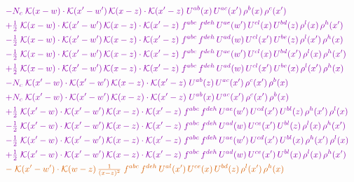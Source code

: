 \documentclass[10pt]{article}
\numberwithin{equation}{section}
\begin{document}
\begin{align}
&\quad{\color{CC}-N_c\;\mathcal{K}(x-w)\cdot\mathcal{K}(x'-w')\,\mathcal{K}(x-z)\cdot\mathcal{K}(x'-z)\;U^{ab}(x)\,U^{ac}(x')\,\rho^{b}(x)\,\rho^{c}(x')}\notag\\
&\quad{\color{CC}+\tfrac{1}{2}\;\mathcal{K}(x-w)\cdot\mathcal{K}(x'-w')\,\mathcal{K}(x-z)\cdot\mathcal{K}(x'-z)\;f^{abc}\,f^{deh}\,U^{ae}(w')\,U^{cl}(x)\,U^{bd}(z)\,\rho^{l}(x)\,\rho^{h}(x')}\notag\\
&\quad{\color{CC}-\tfrac{1}{2}\;\mathcal{K}(x-w)\cdot\mathcal{K}(x'-w')\,\mathcal{K}(x-z)\cdot\mathcal{K}(x'-z)\;f^{abc}\,f^{deh}\,U^{ad}(w)\,U^{cl}(x')\,U^{be}(z)\,\rho^{l}(x')\,\rho^{h}(x)}\notag\\
&\quad{\color{CC}-\tfrac{1}{2}\;\mathcal{K}(x-w)\cdot\mathcal{K}(x'-w')\,\mathcal{K}(x-z)\cdot\mathcal{K}(x'-z)\;f^{abc}\,f^{deh}\,U^{ae}(w')\,U^{cl}(x)\,U^{bd}(x')\,\rho^{l}(x)\,\rho^{h}(x')}\notag\\
&\quad{\color{CC}+\tfrac{1}{2}\;\mathcal{K}(x-w)\cdot\mathcal{K}(x'-w')\,\mathcal{K}(x-z)\cdot\mathcal{K}(x'-z)\;f^{abc}\,f^{deh}\,U^{ad}(w)\,U^{cl}(x')\,U^{be}(x)\,\rho^{l}(x')\,\rho^{h}(x)}\notag\\
&\quad{\color{CC}-N_c\;\mathcal{K}(x'-w)\cdot\mathcal{K}(x'-w')\,\mathcal{K}(x-z)\cdot\mathcal{K}(x'-z)\;U^{ab}(z)\,U^{ac}(x')\,\rho^{c}(x')\,\rho^{b}(x)}\notag\\
&\quad{\color{CC}+N_c\;\mathcal{K}(x'-w)\cdot\mathcal{K}(x'-w')\,\mathcal{K}(x-z)\cdot\mathcal{K}(x'-z)\;U^{ab}(x)\,U^{ac}(x')\,\rho^{c}(x')\,\rho^{b}(x)}\notag\\
&\quad{\color{CC}+\tfrac{1}{2}\;\mathcal{K}(x'-w)\cdot\mathcal{K}(x'-w')\,\mathcal{K}(x-z)\cdot\mathcal{K}(x'-z)\;f^{abc}\,f^{deh}\,U^{ae}(w')\,U^{cd}(x')\,U^{bl}(z)\,\rho^{h}(x')\,\rho^{l}(x)}\notag\\
&\quad{\color{CC}-\tfrac{1}{2}\;\mathcal{K}(x'-w)\cdot\mathcal{K}(x'-w')\,\mathcal{K}(x-z)\cdot\mathcal{K}(x'-z)\;f^{abc}\,f^{deh}\,U^{ad}(w)\,U^{ce}(x')\,U^{bl}(z)\,\rho^{l}(x)\,\rho^{h}(x')}\notag\\
&\quad{\color{CC}-\tfrac{1}{2}\;\mathcal{K}(x'-w)\cdot\mathcal{K}(x'-w')\,\mathcal{K}(x-z)\cdot\mathcal{K}(x'-z)\;f^{abc}\,f^{deh}\,U^{ae}(w')\,U^{cd}(x')\,U^{bl}(x)\,\rho^{h}(x')\,\rho^{l}(x)}\notag\\
&\quad{\color{CC}+\tfrac{1}{2}\;\mathcal{K}(x'-w)\cdot\mathcal{K}(x'-w')\,\mathcal{K}(x-z)\cdot\mathcal{K}(x'-z)\;f^{abc}\,f^{deh}\,U^{ad}(w)\,U^{ce}(x')\,U^{bl}(x)\,\rho^{l}(x)\,\rho^{h}(x')}\notag\\
&\quad{\color{BFK}-\;\mathcal{K}(x'-w')\cdot\mathcal{K}(w-z)\,\tfrac{1}{(x-z)^{2}}\;f^{abc}\,f^{deh}\,U^{al}(x')\,U^{ce}(x)\,U^{bd}(z)\,\rho^{l}(x')\,\rho^{h}(x)}\notag\\

\end{align}
\end{document}
